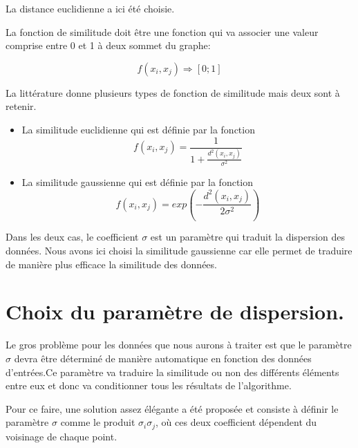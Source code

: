 La distance euclidienne a ici été choisie.

\medskip

La fonction de similitude doit être une fonction qui va associer une valeur comprise entre 0 et 1 à deux sommet du graphe:

\begin{equation}
f(x_i,x_j) \Rightarrow [0 ; 1]
\end{equation}

La littérature donne plusieurs types de fonction de similitude mais deux sont à retenir.
\begin{itemize}

\item La similitude euclidienne qui est définie par la fonction \\
\begin{equation}
f(x_i,x_j) = \frac{1}{1+\frac{d^2(x_i,x_j)}{\sigma^2}}
\end{equation}

\item La similitude gaussienne qui est définie par la fonction \\
\begin{equation}
f(x_i,x_j) = exp(-\frac{d^2(x_i,x_j)}{2\sigma^2})
\end{equation}

\end{itemize}


Dans les deux cas, le coefficient $\sigma$ est un paramètre qui traduit la dispersion des données. Nous avons ici choisi la similitude gaussienne car elle permet de traduire de manière plus efficace la similitude des données.
 
\section{Choix du paramètre de dispersion.}

Le gros problème pour les données que nous aurons à traiter est que le paramètre $\sigma$ devra être déterminé de manière automatique en fonction des données d'entrées.Ce paramètre va traduire la similitude ou non des différents éléments entre eux et donc va conditionner tous les résultats de l'algorithme.

\medskip

Pour ce faire, une solution assez élégante a été proposée \cite{zelnik2004self} et consiste à définir le paramètre $\sigma$ comme le produit $\sigma_i\sigma_j$, où ces deux coefficient dépendent du voisinage de chaque point.


